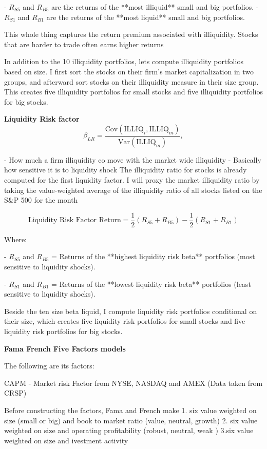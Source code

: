 - \( R_{S5} \) and \( R_{B5} \) are the returns of the **most illiquid** small and big portfolios.
- \( R_{S1} \) and \( R_{B1} \) are the returns of the **most liquid** small and big portfolios.



This whole thing captures the return premium associated with illiquidity. Stocks that are harder to trade often earns higher returns


In addition to the 10 illiquidity portfolios, lets compute illiquidity portfolios based on size. I first sort the stocks on their firm’s market capitalization in two groups, and afterward sort stocks on their illiquidity measure in their size group. This creates five illiquidity portfolios for small stocks and five illiquidity portfolios for big stocks.

\textbf{Liquidity Risk factor}
$$
\beta_{LR} = \frac{\text{Cov}(\text{ILLIQ}_i, \text{ILLIQ}_m)}{\text{Var}(\text{ILLIQ}_m)},
$$

- How much a firm illiquidity co move with the market wide illiquidity
- Basically how sensitive it is to liquidity shock 
The illiquidity ratio for stocks is already computed for the first liquidity factor. I will proxy the market illiquidity ratio by taking the value-weighted average of the illiquidity ratio of all stocks
listed on the S\&P 500 for the month


$$
\text{Liquidity Risk Factor Return} = \frac{1}{2} \left( R_{S5} + R_{B5} \right) - \frac{1}{2} \left( R_{S1} + R_{B1} \right)
$$

Where:

- \( R_{S5} \) and \( R_{B5} \) = Returns of the **highest liquidity risk beta** portfolios (most sensitive to liquidity shocks).

- \( R_{S1} \) and \( R_{B1} \) = Returns of the **lowest liquidity risk beta** portfolios (least sensitive to liquidity shocks).

Beside the ten size beta liquid, I compute liquidity risk portfolios conditional on their size,
which creates five liquidity risk portfolios for small stocks and five liquidity risk portfolios for
big stocks.

\textbf{Fama French Five Factors models}

The following are its factors:

CAPM
- Market risk Factor from NYSE, NASDAQ and AMEX (Data taken from CRSP)

Before constructing the factors, Fama and French make 
1. six value weighted on size (small or big) and book to market ratio (value, neutral, growth)
2. six value weighted on size and operating profitability (robust, neutral, weak )
3.six value weighted on size and ivestment activity

